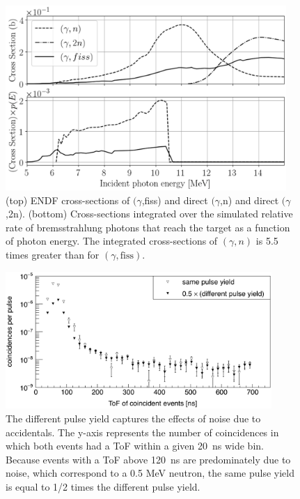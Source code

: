 \begin{figure}[]
\centering
    \includegraphics[width=0.95\textwidth]{Content/Methods/CrossSections.png}
    \caption{(top) ENDF cross-sections of $(\gamma$,fiss) and direct $(\gamma$,n) and direct $(\gamma$,2n).
    (bottom) Cross-sections integrated over the simulated relative rate of bremsstrahlung photons that reach the target as a function of photon energy. The integrated cross-sections of $(\gamma, n)$ is 5.5 times greater than for $(\gamma, \text{fiss})$. }
    \label{fig:CrossSection}
\end{figure}
\begin{figure}[]
\centering
    \includegraphics[width=0.9\textwidth]{Content/Methods/NoiseSubtraction.png}
    \caption{The different pulse yield captures the effects of noise due to accidentals.
    The y-axis represents the number of coincidences in which both events had a ToF within a given 20~ns wide bin.
    Because events with a ToF above 120~ns are predominately due to noise, which correspond to a 0.5 MeV neutron, the same pulse yield is equal to 1/2 times the different pulse yield.
    }
    \label{noise_siubtraction}
\end{figure}

